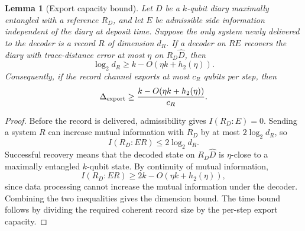 \documentclass[11pt]{article}
\newtheorem{lemma}{Lemma}
\begin{document}
\begin{lemma}[Export capacity bound]
\label{lem:export-capacity}
Let $D$ be a $k$-qubit diary maximally entangled with a reference
$R_D$, and let $E$ be admissible side information independent of the
diary at deposit time.  Suppose the only system newly delivered to the
decoder is a record $R$ of dimension $d_R$.  If a decoder on $RE$
recovers the diary with trace-distance error at most $\eta$ on
$R_D\widehat D$, then
\begin{equation}
  \log_2 d_R
  \ge
  k-O\!\left(\eta k+h_2(\eta)\right).
\end{equation}
Consequently, if the record channel exports at most $c_R$ qubits per
step, then
\begin{equation}
  \Delta_{\rm export}
  \ge
  \frac{k-O\!\left(\eta k+h_2(\eta)\right)}{c_R}.
\end{equation}
\end{lemma}

\begin{proof}
Before the record is delivered, admissibility gives $I(R_D:E)=0$.
Sending a system $R$ can increase mutual information with $R_D$ by at
most $2\log_2 d_R$, so
\begin{equation}
  I(R_D:ER)\le 2\log_2 d_R .
\end{equation}
Successful recovery means that the decoded state on $R_D\widehat D$ is
$\eta$-close to a maximally entangled $k$-qubit state.  By continuity of
mutual information,
\begin{equation}
  I(R_D:ER)\ge
  2k-O\!\left(\eta k+h_2(\eta)\right),
\end{equation}
since data processing cannot increase the mutual information under the
decoder.  Combining the two inequalities gives the dimension bound.  The
time bound follows by dividing the required coherent record size by the
per-step export capacity.
\end{proof}
\end{document}
